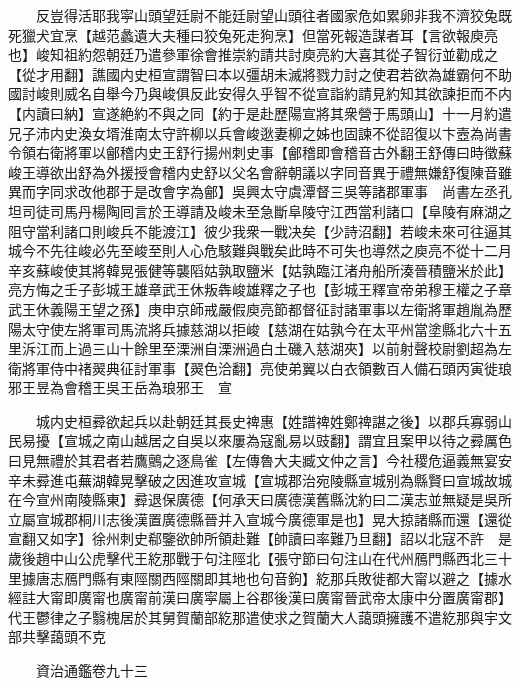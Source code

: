 　　反豈得活耶我寜山頭望廷尉不能廷尉望山頭往者國家危如累卵非我不濟狡兔既死獵犬宜烹【越范蠡遺大夫種曰狡兔死走狗烹】但當死報造謀者耳【言欲報庾亮也】峻知祖約怨朝廷乃遣參軍徐會推崇約請共討庾亮約大喜其從子智衍並勸成之【從才用翻】譙國内史桓宣謂智曰本以彊胡未滅將戮力討之使君若欲為雄霸何不助國討峻則威名自舉今乃與峻俱反此安得久乎智不從宣詣約請見約知其欲諫拒而不内【内讀曰納】宣遂絶約不與之同【約于是赴歷陽宣將其衆營于馬頭山】十一月約遣兄子沛内史渙女壻淮南太守許柳以兵會峻逖妻柳之姊也固諫不從詔復以卞壼為尚書令領右衛將軍以鄶稽内史王舒行揚州刺史事【鄶稽即會稽音古外翻王舒傳曰時徵蘇峻王導欲出舒為外援授會稽内史舒以父名會辭朝議以字同音異于禮無嫌舒復陳音雖異而字同求改他郡于是改會字為鄶】吳興太守虞潭督三吳等諸郡軍事　尚書左丞孔坦司徒司馬丹楊陶囘言於王導請及峻未至急斷阜陵守江西當利諸口【阜陵有麻湖之阻守當利諸口則峻兵不能渡江】彼少我衆一戰决矣【少詩沼翻】若峻未來可往逼其城今不先往峻必先至峻至則人心危駭難與戰矣此時不可失也導然之庾亮不從十二月辛亥蘇峻使其將韓晃張健等襲䧟姑孰取鹽米【姑孰臨江渚舟船所湊晉積鹽米於此】亮方悔之壬子彭城王雄章武王休叛犇峻雄釋之子也【彭城王釋宣帝弟穆王權之子章武王休義陽王望之孫】庚申京師戒嚴假庾亮節都督征討諸軍事以左衛將軍趙胤為歷陽太守使左將軍司馬流將兵據慈湖以拒峻【慈湖在姑孰今在太平州當塗縣北六十五里泝江而上過三山十餘里至溧洲自溧洲過白土磯入慈湖夾】以前射聲校尉劉超為左衛將軍侍中禇翜典征討軍事【翜色洽翻】亮使弟翼以白衣領數百人備石頭丙寅徙琅邪王昱為會稽王吳王岳為琅邪王　宣

　　城内史桓彛欲起兵以赴朝廷其長史禆惠【姓譜禆姓鄭禆諶之後】以郡兵寡弱山民易擾【宣城之南山越居之自吳以來屢為寇亂易以豉翻】謂宜且案甲以待之彛厲色曰見無禮於其君者若鷹鸇之逐鳥雀【左傳魯大夫臧文仲之言】今社稷危逼義無宴安辛未彛進屯蕪湖韓晃擊破之因進攻宣城【宣城郡治宛陵縣宣城别為縣賢曰宣城故城在今宣州南陵縣東】彛退保廣德【何承天曰廣德漢舊縣沈約曰二漢志並無疑是吳所立屬宣城郡桐川志後漢置廣德縣晉并入宣城今廣德軍是也】晃大掠諸縣而還【還從宣翻又如字】徐州刺史郗鑒欲帥所領赴難【帥讀曰率難乃旦翻】詔以北寇不許　是歲後趙中山公虎擊代王紇那戰于句注陘北【張守節曰句注山在代州鴈門縣西北三十里據唐志鴈門縣有東陘關西陘關即其地也句音鉤】紇那兵敗徙都大甯以避之【據水經註大甯即廣甯也廣甯前漢曰廣寜屬上谷郡後漢曰廣甯晉武帝太康中分置廣甯郡】　代王鬱律之子翳槐居於其舅賀蘭部紇那遣使求之賀蘭大人藹頭擁護不遣紇那與宇文部共擊藹頭不克

　　資治通鑑卷九十三


    


 


 



